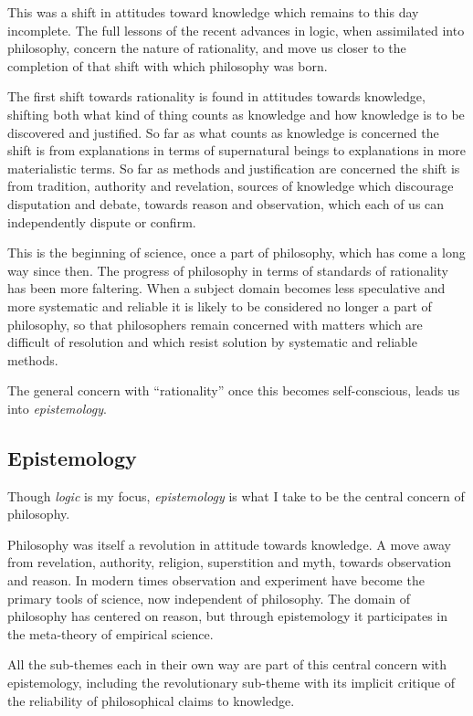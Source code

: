 This was a shift in attitudes toward knowledge which remains to this day incomplete.
The full lessons of the recent advances in logic, when assimilated into philosophy, concern the nature of rationality, and move us closer to the completion of that shift with which philosophy was born.

The first shift towards rationality is found in attitudes towards knowledge, shifting both what kind of thing counts as knowledge and how knowledge is to be discovered and justified.
So far as what counts as knowledge is concerned the shift is from explanations in terms of supernatural beings to explanations in more materialistic terms.
So far as methods and justification are concerned the shift is from tradition, authority and revelation, sources of knowledge which discourage disputation and debate, towards reason and observation, which each of us can independently dispute or confirm.

This is the beginning of science, once a part of philosophy, which has come a long way since then.
The progress of philosophy in terms of standards of rationality has been more faltering.
When a subject domain becomes less speculative and more systematic and reliable it is likely to be considered no longer a part of philosophy, so that philosophers remain concerned with matters which are difficult of resolution and which resist solution by systematic and reliable methods.

The general concern with ``rationality'' once this becomes self-conscious, leads us into {\it epistemology}.

\subsection{Epistemology}


Though {\it logic} is my focus, {\it epistemology} is what I take to be the central concern of philosophy.

Philosophy was itself a revolution in attitude towards knowledge.
A move away from revelation, authority, religion, superstition and myth, towards observation and reason.
In modern times observation and experiment have become the primary tools of science, now independent of philosophy.
The domain of philosophy has centered on reason, but through epistemology it participates in the meta-theory of empirical science.

All the sub-themes each in their own way are part of this central concern with epistemology, including the revolutionary sub-theme with its implicit critique of the reliability of philosophical claims to knowledge.

